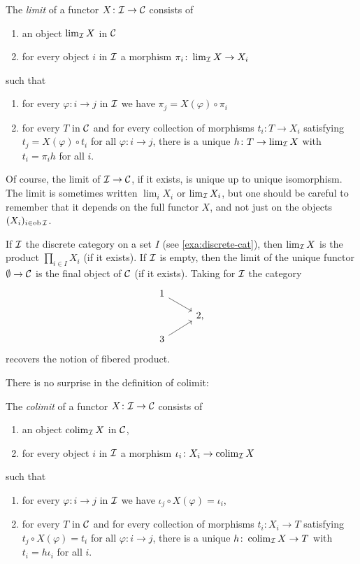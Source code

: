 \begin{definition}The \emph{limit} of a functor $X\colon {\mathcal{I}} \to {\mathcal{C}}$  consists of
\begin{enumerate}
\item an object $\lim_{\mathcal{I}} X$ in ${\mathcal{C}}$
\item for every object $i$ in ${\mathcal{I}}$ a morphism $\pi_i \colon \lim_{\mathcal{I}} X \to X_i$
\end{enumerate}
such that
\begin{enumerate}
\item for every $\varphi\colon i \to j$ in ${\mathcal{I}}$ we have $\pi_j = X(\varphi) \circ \pi_i$
\item for every $T$ in ${\mathcal{C}}$ and for every collection of morphisms $t_i\colon T\to X_i$ satisfying $t_j = X(\varphi) \circ t_i$ for all $\varphi\colon i\to j$, there is a unique $h\colon T\to \lim_{\mathcal{I}} X$ with $t_i = \pi_i h$ for all $i$.
\end{enumerate}
\end{definition}

Of course, the limit of ${\mathcal{I}} \to {\mathcal{C}}$, if it exists, is unique up to unique isomorphism. The limit is sometimes written $\lim_i X_i$ or $\lim_{\mathcal{I}} X_i$, but one should be careful to remember that it depends on the full functor $X$, and not just on the objects $(X_i)_{i \in \operatorname{ob} {\mathcal{I}}}$.


\begin{examples}\label{exa:three-limits}
If ${\mathcal{I}}$ the discrete category on a set $I$ (see \ref{exa:discrete-cat}), then $\lim_{\mathcal{I}} X$ is the product $\prod_{i\in I} X_i$ (if it exists). If ${\mathcal{I}}$ is empty, then the limit of the unique functor $\emptyset\to {\mathcal{C}}$ is the final object of ${\mathcal{C}}$ (if it exists). Taking for ${\mathcal{I}}$ the category
\[
\begin{tikzcd}[row sep=small]
	1 \arrow{rd} & \\  & 2, \\ 3 \arrow{ru} & 
\end{tikzcd}
\]
recovers the notion of  fibered product.  
\end{examples}


There is no surprise in the definition of colimit: 

\begin{definition}The \emph{colimit} of a functor $X\colon {\mathcal{I}} \to {\mathcal{C}}$  consists of
\begin{enumerate}
\item an object $\operatorname{colim}_{\mathcal{I}} X$ in ${\mathcal{C}}$,
\item for every object $i$ in ${\mathcal{I}}$ a morphism $\iota_i \colon X_i \to \operatorname{colim}_{\mathcal{I}} X$
\end{enumerate}
such that
\begin{enumerate}
\item for every $\varphi\colon i \to j$ in ${\mathcal{I}}$ we have $\iota_j \circ X(\varphi) = \iota_i$,
\item for every $T$ in ${\mathcal{C}}$ and for every collection of morphisms $t_i\colon X_i\to T$ satisfying $t_j \circ X(\varphi) = t_i$ for all $\varphi\colon i\to j$, there is a unique $h\colon \operatorname{colim}_{\mathcal{I}} X\to T$ with $t_i = h \iota_i$ for all $i$.
\end{enumerate}
\end{definition}

